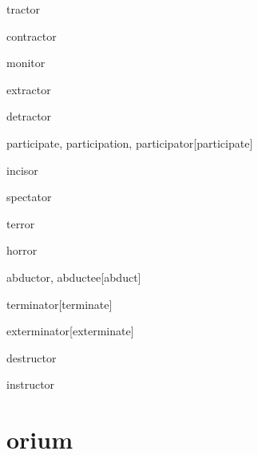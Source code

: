 \begin{RefWord}{tractor}
\end{RefWord}

\begin{RefWord}{contractor}
\end{RefWord}

\begin{RefWord}{monitor}
\end{RefWord}

\begin{RefWord}{extractor}
\end{RefWord}

\begin{RefWord}{detractor}
\end{RefWord}

\begin{RefWord}{participate, participation, participator}[participate]
\end{RefWord}

\begin{RefWord}{incisor}
\end{RefWord}

\begin{RefWord}{spectator}
\end{RefWord}

\begin{RefWord}{terror}
\end{RefWord}

\begin{RefWord}{horror}
\end{RefWord}

\begin{RefWord}{abductor, abductee}[abduct]
\end{RefWord}

\begin{RefWord}{terminator}[terminate]
\end{RefWord}

\begin{RefWord}{exterminator}[exterminate]
\end{RefWord}

\begin{RefWord}{destructor}
\end{RefWord}

\begin{RefWord}{instructor}
\end{RefWord}

\section{orium}


